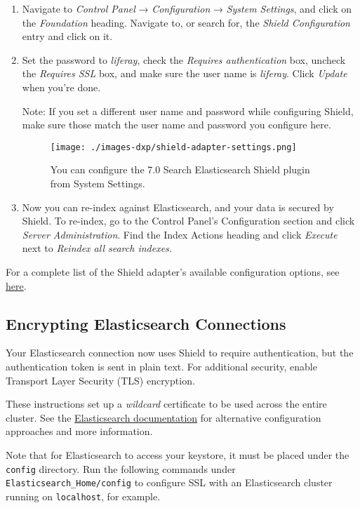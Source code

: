 \begin{enumerate}
\def\labelenumi{\arabic{enumi}.}
\item
  Navigate to \emph{Control Panel} → \emph{Configuration} → \emph{System
  Settings}, and click on the \emph{Foundation} heading. Navigate to, or
  search for, the \emph{Shield Configuration} entry and click on it.
\item
  Set the password to \emph{liferay}, check the \emph{Requires
  authentication} box, uncheck the \emph{Requires SSL} box, and make
  sure the user name is \emph{liferay}. Click \emph{Update} when you're
  done.

  Note: If you set a different user name and password while configuring
  Shield, make sure those match the user name and password you configure
  here.

  \begin{figure}
  \centering
  \texttt{[image: ./images-dxp/shield-adapter-settings.png]}
  \caption{You can configure the 7.0 Search Elasticsearch Shield plugin
  from System Settings.}
  \end{figure}
\item
  Now you can re-index against Elasticsearch, and your data is secured
  by Shield. To re-index, go to the Control Panel's Configuration
  section and click \emph{Server Administration}. Find the Index Actions
  heading and click \emph{Execute} next to \emph{Reindex all search
  indexes.}
\end{enumerate}

For a complete list of the Shield adapter's available configuration
options, see
\href{/docs/7-0/deploy/-/knowledge_base/d/shield-adapter-settings}{here}.

\subsection{Encrypting Elasticsearch
Connections}\label{encrypting-elasticsearch-connections}

Your Elasticsearch connection now uses Shield to require authentication,
but the authentication token is sent in plain text. For additional
security, enable Transport Layer Security (TLS) encryption.

These instructions set up a \emph{wildcard} certificate to be used
across the entire cluster. See the
\href{https://www.elastic.co/guide/en/shield/2.4/ssl-tls.html}{Elasticsearch
documentation} for alternative configuration approaches and more
information.

Note that for Elasticsearch to access your keystore, it must be placed
under the \texttt{config} directory. Run the following commands under
\texttt{Elasticsearch\_Home/config} to configure SSL with an
Elasticsearch cluster running on \texttt{localhost}, for example.

